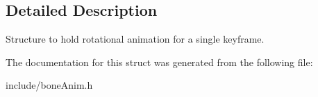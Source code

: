 \subsection{Detailed Description}
Structure to hold rotational animation for a single keyframe. 

The documentation for this struct was generated from the following file\+:\begin{DoxyCompactItemize}
\item 
include/bone\+Anim.\+h\end{DoxyCompactItemize}
